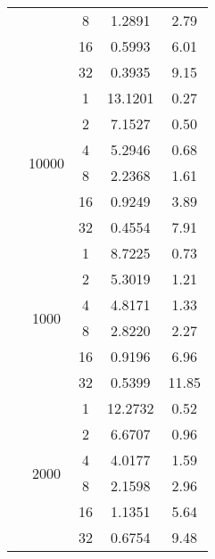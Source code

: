\begin{tabularx}{\textwidth}{@{} c c c c c @{}}
                            &                       & 8  & 1.2891 & 2.79 \\
                            &                       & 16 & 0.5993 & 6.01 \\
                            &                       & 32 & 0.3935 & 9.15 \\
                            \cmidrule{2-5}
                            & \multirow{6}{*}{10000} & 1  & 13.1201 & 0.27 \\
                            &                        & 2  & 7.1527  & 0.50 \\
                            &                        & 4  & 5.2946  & 0.68 \\
                            &                        & 8  & 2.2368  & 1.61 \\
                            &                        & 16 & 0.9249  & 3.89 \\
                            &                        & 32 & 0.4554  & 7.91 \\
\midrule\enlargethispage{-\baselineskip}
    \multirow{24}{*}{40000} & \multirow{6}{*}{1000} & 1  & 8.7225 & 0.73  \\
                            &                       & 2  & 5.3019 & 1.21  \\
                            &                       & 4  & 4.8171 & 1.33  \\
                            &                       & 8  & 2.8220 & 2.27  \\
                            &                       & 16 & 0.9196 & 6.96  \\
                            &                       & 32 & 0.5399 & 11.85 \\
                            \cmidrule{2-5}
                            & \multirow{6}{*}{2000} & 1  & 12.2732 & 0.52 \\
                            &                       & 2  & 6.6707  & 0.96 \\
                            &                       & 4  & 4.0177  & 1.59 \\
                            &                       & 8  & 2.1598  & 2.96 \\
                            &                       & 16 & 1.1351  & 5.64 \\
                            &                       & 32 & 0.6754  & 9.48 \\
                            \cmidrule{2-5}

\end{tabularx}

